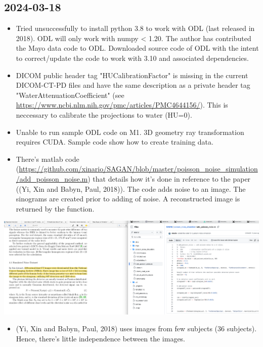 \documentclass[a4paper, 11pt]{article}
\begin{document}
\subsection{2024-03-18}
\label{sec:orga7c6003}
\begin{itemize}
\item Tried unsuccessfully to install python 3.8 to work with ODL (last released in 2018). ODL will only work with numpy < 1.20. The author has contributed the Mayo data code to ODL. Downloaded source code of ODL with the intent to correct/update the code to work with 3.10 and associated dependencies.
\item DICOM public header tag "HUCalibrationFactor" is missing in the current DICOM-CT-PD files and have the same description as a private header tag "WaterAttenuationCoefficient" (see \url{https://www.ncbi.nlm.nih.gov/pmc/articles/PMC4644156/}). This is neccessary to calibrate the projections to water (HU=0).
\item Unable to run sample ODL code on M1. 3D geometry ray transformation requires CUDA. Sample code show how to create training data.
\item There's matlab code  (\url{https://github.com/xinario/SAGAN/blob/master/poisson\_noise\_simulation/add\_poisson\_noise.m}) that details how it's done in reference to the paper ((Yi, Xin and Babyn, Paul, 2018)). The code adds noise to an image. The sinograms are created prior to adding of noise. A reconstructed image is returned by the function.
\end{itemize}

\begin{center}
\includegraphics[width=.9\linewidth]{20240318-192545_screenshot.png}
\end{center}

\begin{itemize}
\item (Yi, Xin and Babyn, Paul, 2018) uses images from few subjects (36 subjects). Hence, there's little independence between the images.
\end{itemize}
\end{document}
